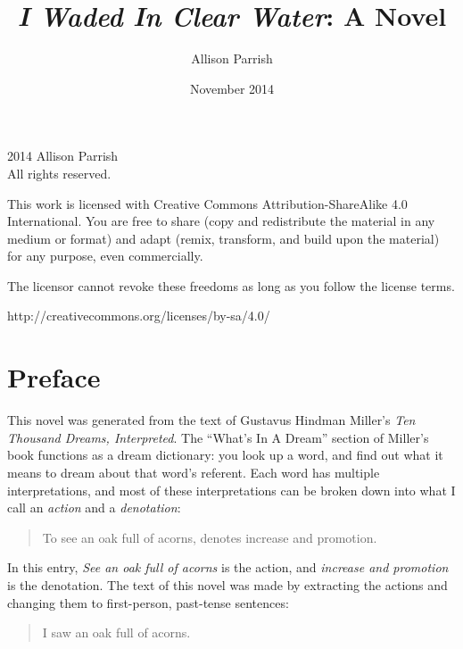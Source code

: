 \documentclass[12pt]{book}
\begin{document}
\title{\textit{I Waded In Clear Water}: A Novel}
\author{Allison Parrish}
\date{November 2014}

\frontmatter
\maketitle

\pagestyle{empty}
\begingroup
\footnotesize
\parindent 0pt
\parskip \baselineskip
\textcopyright{} 2014 Allison Parrish \\
All rights reserved.

This work is licensed with Creative Commons Attribution-ShareAlike 4.0
International. You are free to share (copy and redistribute the material in any
medium or format) and adapt (remix, transform, and build upon the material) for
any purpose, even commercially.

The licensor cannot revoke these freedoms as long as you follow the license
terms.

http://creativecommons.org/licenses/by-sa/4.0/

\endgroup
\clearpage

\pagestyle{myheadings}

\chapter{Preface}

This novel was generated from the text of Gustavus Hindman Miller's \textit{Ten
Thousand Dreams, Interpreted}. The ``What's In A Dream'' section of Miller's
book functions as a dream dictionary: you look up a word, and find out what it
means to dream about that word's referent. Each word has multiple interpretations,
and most of these interpretations can be broken down into what I
call an \textit{action} and a \textit{denotation}:

\begin{quote}
To see an oak full of acorns, denotes increase and promotion.
\end{quote}

In this entry, \textit{See an oak full of acorns} is the action, and
\textit{increase and promotion} is the denotation. The text of this novel was
made by extracting the actions and changing them to first-person, past-tense
sentences:

\begin{quote}
I saw an oak full of acorns.
\end{quote}
\end{document}
